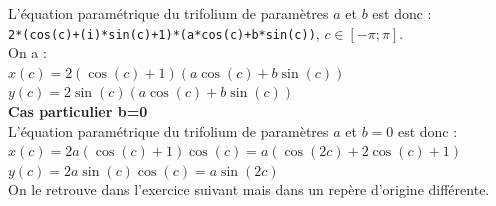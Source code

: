\documentclass[a4paper,11pt]{book}
\begin{document}
L'\'equation param\'etrique du trifolium de param\`etres $a$ et $b$ est donc :\\
{\tt 2*(cos(c)+(i)*sin(c)+1)*(a*cos(c)+b*sin(c))},  $c\in [-\pi;\pi]$.\\
On a :\\
$x(c)=2(\cos(c)+1)(a\cos(c)+b\sin(c))$\\
$y(c)=2\sin(c)(a\cos(c)+b\sin(c))$\\
{\bf Cas particulier b=0}\\
L'\'equation param\'etrique du trifolium de param\`etres $a$ et $b=0$ est donc :\\
$x(c)=2a(\cos(c)+1)\cos(c)=a(\cos(2c)+2\cos(c)+1)$\\
$ y(c)=2a\sin(c)\cos(c)=a\sin(2c)$\\
On le retrouve dans l'exercice suivant mais dans un rep\`ere d'origine diff\'erente.
\end{document}
